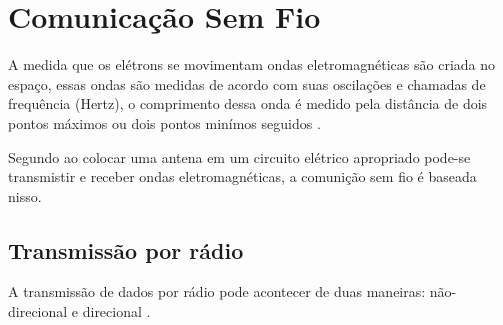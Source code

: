\section{Comunicação Sem Fio}
    \par
    A medida que os elétrons se movimentam ondas eletromagnéticas são criada no espaço, essas ondas são medidas de acordo com suas oscilações e chamadas de frequência (Hertz), o comprimento dessa onda é medido pela distância de dois pontos máximos ou dois pontos minímos seguidos \cite{tenenbaum2002}.
    \par
    Segundo \citeauthor{tenenbaum2002} ao colocar uma antena em um circuito elétrico apropriado pode-se  transmistir e receber ondas eletromagnéticas, a comunição sem fio é baseada nisso.
    
    \subsection{Transmissão por rádio}
        
        \par
        A transmissão de dados por rádio pode acontecer de duas maneiras: não-direcional e direcional  \cite{torres2001}.
        
